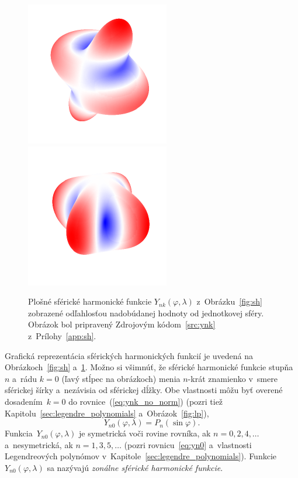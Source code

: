 \documentclass[a4paper,12pt]{book}
\begin{document}
\begin{figure}[bt]
\includegraphics{./fig-spherical-harmonic-n4-k1-3d.pdf}
\includegraphics{./fig-spherical-harmonic-n4-k4-3d.pdf}
\caption{Plošné sférické harmonické funkcie $Y_{nk}(\varphi, \lambda)$
z~Obrázku~\ref{fig:sh} zobrazené odľahlosťou nadobúdanej hodnoty od jednotkovej
sféry.  Obrázok bol pripravený Zdrojovým kódom~\ref{src:ynk}
z~Prílohy~\ref{app:sh}.}
\label{fig:sh3d}
\end{figure}

Grafická reprezentácia sférických harmonických funkcií je uvedená na 
Obrázkoch~\ref{fig:sh} a~\ref{fig:sh3d}.  Možno si všimnúť, že sférické 
harmonické funkcie stupňa~$n$ a~rádu $k = 0$ (ľavý stĺpec na obrázkoch) menia 
$n$-krát znamienko v~smere sférickej šírky a~nezávisia od sférickej dĺžky.  Obe 
vlastnosti môžu byť overené dosadením~$k = 0$ do rovnice~(\ref{eq:ynk_no_norm}) 
(pozri tiež Kapitolu~\ref{sec:legendre_polynomials} a~Obrázok~\ref{fig:lp}),
%
\begin{equation}
\label{eq:yn0}
Y_{n0}(\varphi, \lambda) = P_n(\sin\varphi){.}
\end{equation}
%
Funkcia~$Y_{n0}(\varphi, \lambda)$ je symetrická voči rovine rovníka, ak $n 
= 0, 2, 4, \dots$ a~nesymetrická, ak $n = 1, 3, 5, \dots$ (pozri 
rovnicu~\ref{eq:yn0} a~vlastnosti Legendreových polynómov 
v~Kapitole~\ref{sec:legendre_polynomials}). Funkcie~$Y_{n0}(\varphi, \lambda)$ 
sa nazývajú \emph{zonálne sférické harmonické funkcie}.
\end{document}
